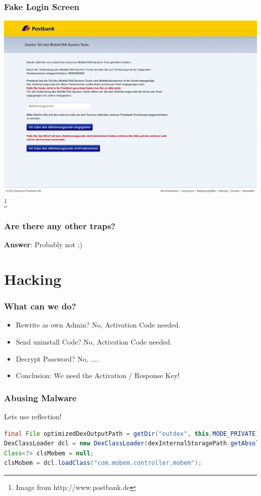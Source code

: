 \documentclass[12pt,a4paper]{beamer}
\newcommand\blfootnote[1]{%
  \begingroup
  \renewcommand\thefootnote{}\footnote{#1}%
  \addtocounter{footnote}{-1}%
  \endgroup
}
\begin{document}
\begin{frame}
\frametitle{Fake Login Screen}
\includegraphics[width=\textwidth]{images/aktivierunsgcode-bank.jpg}
\blfootnote{Image from http://www.postbank.de}
\end{frame}

\begin{frame}
\frametitle{Are there any other traps?}

\textbf{Answer}: Probably not ;)

\end{frame}

\section{Hacking}
\begin{frame}
\frametitle{What can we do?}
\begin{itemize}
	\item Rewrite as own Admin? No, Activation Code needed.
	\item Send uninstall Code? No, Activation Code needed.
	\item Decrypt Password? No, ....
	\item Conclusion: We need the Activation / Response Key!
\end{itemize}

\end{frame}

\begin{frame}[fragile]
\frametitle{Abusing Malware}
Lets use reflection!

\begin{lstlisting}[language=java,basicstyle=\smaller,stringstyle=\color{orange},identifierstyle=\color{blue}]
final File optimizedDexOutputPath = getDir("outdex", this.MODE_PRIVATE);
DexClassLoader dcl = new DexClassLoader(dexInternalStoragePath.getAbsolutePath(),optimizedDexOutputPath.getAbsolutePath(),null,this.getClassLoader());
Class<?> clsMobem = null;
clsMobem = dcl.loadClass("com.mobem.controller.mobem");
\end{lstlisting}

\end{frame}
\end{document}
